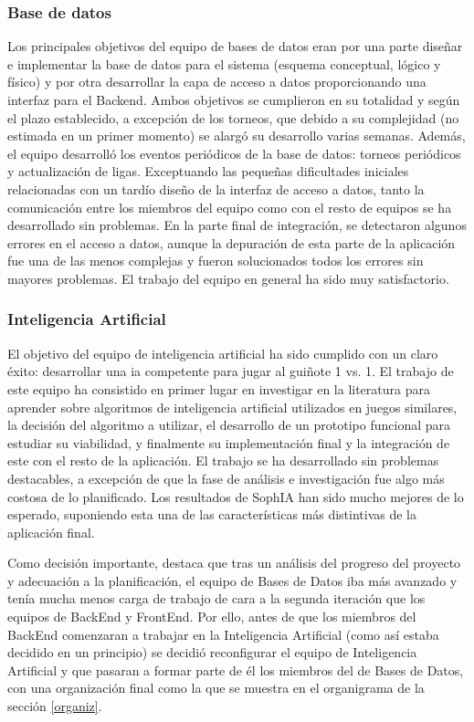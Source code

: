 \subsubsection*{Base de datos}
Los principales objetivos del equipo de bases de datos eran por una parte diseñar e implementar la base de datos para el sistema (esquema conceptual, lógico y físico) y por otra desarrollar la capa de acceso a datos proporcionando una interfaz para el Backend. Ambos objetivos se cumplieron en su totalidad y según el plazo establecido, a excepción de los torneos, que debido a su complejidad (no estimada en un primer momento) se alargó su desarrollo varias semanas. Además, el equipo desarrolló los eventos periódicos de la base de datos: torneos periódicos y actualización de ligas. Exceptuando las pequeñas dificultades iniciales relacionadas con un tardío diseño de la interfaz de acceso a datos, tanto la comunicación entre los miembros del equipo como con el resto de equipos se ha desarrollado sin problemas. En la parte final de integración, se detectaron algunos errores en el acceso a datos, aunque la depuración de esta parte de la aplicación fue una de las menos complejas y fueron solucionados todos los errores sin mayores problemas. El trabajo del equipo en general ha sido muy satisfactorio. 

\subsubsection*{Inteligencia Artificial}
El objetivo del equipo de inteligencia artificial ha sido cumplido con un claro éxito: desarrollar una ia competente para jugar al guiñote 1 vs. 1. El trabajo de este equipo ha consistido en primer lugar en investigar en la literatura para aprender sobre algoritmos de inteligencia artificial utilizados en juegos similares, la decisión del algoritmo a utilizar, el desarrollo de un prototipo funcional para estudiar su viabilidad, y finalmente su implementación final y la integración de este con el resto de la aplicación. El trabajo se ha desarrollado sin problemas destacables, a excepción de que la fase de análisis e investigación fue algo más costosa de lo planificado. Los resultados de SophIA han sido mucho mejores de lo esperado, suponiendo esta una de las características más distintivas de la aplicación final.

Como decisión importante, destaca que tras un análisis del progreso del proyecto y adecuación a la planificación, el equipo de Bases de Datos iba más avanzado y tenía mucha menos carga de trabajo de cara a la segunda iteración que los equipos de BackEnd y FrontEnd. Por ello, antes de que los miembros del BackEnd comenzaran a trabajar en la Inteligencia Artificial (como así estaba decidido en un principio) se decidió reconfigurar el equipo de Inteligencia Artificial y que pasaran a formar parte de él los miembros del de Bases de Datos, con una organización final como la que se muestra en el organigrama de la sección \ref{organiz}.

